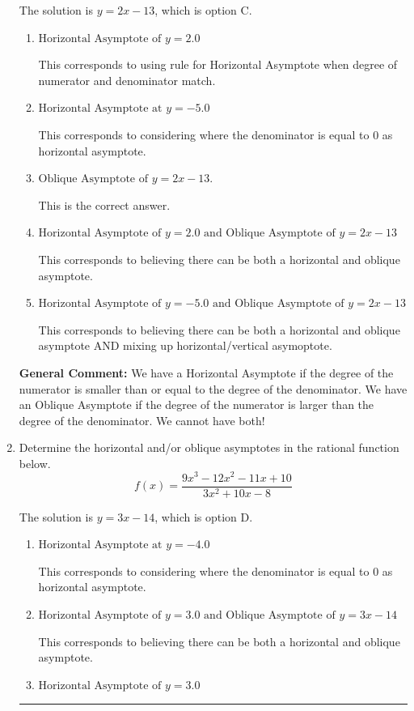 \documentclass{extbook}[14pt]
\newcommand{\litem}[1]{\item #1

\rule{\textwidth}{0.4pt}}
\begin{document}
\begin{enumerate}
{The solution is \( y = 2x -13 \), which is option C.\begin{enumerate}[label=\Alph*.]
\item \( \text{Horizontal Asymptote of } y = 2.0  \)

This corresponds to using rule for Horizontal Asymptote when degree of numerator and denominator match.
\item \( \text{Horizontal Asymptote at } y = -5.0 \)

This corresponds to considering where the denominator is equal to 0 as horizontal asymptote.
\item \( \text{Oblique Asymptote of } y = 2x -13. \)

This is the correct answer.
\item \( \text{Horizontal Asymptote of } y = 2.0 \text{ and Oblique Asymptote of } y = 2x -13 \)

This corresponds to believing there can be both a horizontal and oblique asymptote.
\item \( \text{Horizontal Asymptote of } y = -5.0 \text{ and Oblique Asymptote of } y = 2x -13 \)

This corresponds to believing there can be both a horizontal and oblique asymptote AND mixing up horizontal/vertical asymoptote.
\end{enumerate}

\textbf{General Comment:} We have a Horizontal Asymptote if the degree of the numerator is smaller than or equal to the degree of the denominator. We have an Oblique Asymptote if the degree of the numerator is larger than the degree of the denominator. We cannot have both!
}
\litem{
Determine the horizontal and/or oblique asymptotes in the rational function below.
\[ f(x) = \frac{9x^{3} -12 x^{2} -11 x + 10}{3x^{2} +10 x -8} \]

The solution is \( y = 3x -14 \), which is option D.\begin{enumerate}[label=\Alph*.]
\item \( \text{Horizontal Asymptote at } y = -4.0 \)

This corresponds to considering where the denominator is equal to 0 as horizontal asymptote.
\item \( \text{Horizontal Asymptote of } y = 3.0 \text{ and Oblique Asymptote of } y = 3x -14 \)

This corresponds to believing there can be both a horizontal and oblique asymptote.
\item \( \text{Horizontal Asymptote of } y = 3.0  \)


\end{enumerate}}
\end{enumerate}
\end{document}
